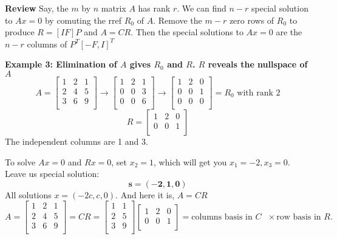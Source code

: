 \textbf{Review} Say, the \(m\) by \(n\) matrix \(A\) has rank \(r\). We can find \(n - r\) special solution to \(Ax = 0\)  by comuting the rref \(R_0\) of \(A\). Remove the \(m - r\) zero rows of \(R_0\) to produce \(R = [I F] P\) and \(A = CR\). Then the special solutions to \(Ax = 0\) are the \(n - r\) columns of \(P^T [-F, I]^T\)  

\textbf{Example 3: Elimination of \(A\) gives \(R_0\) and \(R\). \(R\) reveals the nullspace of \(A\) } 
\[
    A =
    \begin{bmatrix}
        1 & 2 & 1  \\
        2 & 4 & 5  \\
        3 & 6 & 9  \\
    \end{bmatrix}
    \rightarrow
    \begin{bmatrix}
        1 & 2 & 1  \\
        0 & 0 & 3  \\
        0 & 0 & 6  \\
    \end{bmatrix}
    \rightarrow
    \begin{bmatrix}
        1 & 2 & 0  \\
        0 & 0 & 1  \\
        0 & 0 & 0  \\
    \end{bmatrix}
    = R_0
    \text{ with rank 2}
\]
\[
    R = 
    \begin{bmatrix}
        1 & 2 & 0  \\
        0 & 0 & 1  \\
    \end{bmatrix}
\]
The independent columns are 1 and 3. 

To solve \(Ax = 0\) and \(Rx = 0\), set \(x_2 = 1\), which will get you \(x_1 = -2, x_3 = 0\). Leave us special solution:
\[
    \mathbf{s = (-2, 1, 0)}  
\]  
All solutions \(x = (-2c, c, 0)\). And here it is, \(A = CR\)
\[
     A =
    \begin{bmatrix}
        1 & 2 & 1  \\
        2 & 4 & 5  \\
        3 & 6 & 9  \\
    \end{bmatrix}
    = CR =
    \begin{bmatrix}
        1 & 1  \\
        2 & 5  \\
        3 & 9  \\
    \end{bmatrix}
    \begin{bmatrix}
        1 & 2 & 0  \\
        0 & 0 & 1  \\
    \end{bmatrix}
    = 
    \text{columns basis in \(C\) } \times \text{row basis in \(R\).}
\]  

